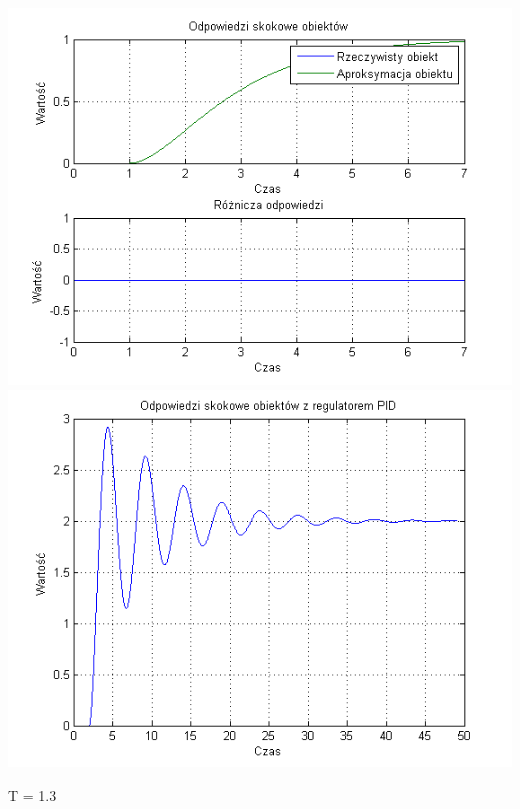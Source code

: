 \documentclass[10pt,a4paper]{article}
\begin{document}
\begin{center}
\includegraphics[scale=1]{images/dwa/skrypt_59.png}\\
\includegraphics[scale=1]{images/dwa/skrypt_60.png}\\
\end{center}
\newpage
T = 1.3
\end{document}
